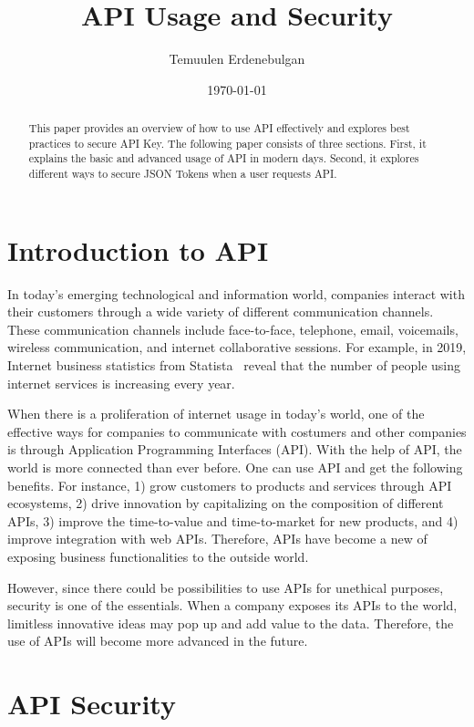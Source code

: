 \documentclass[11pt]{article}
\title{API Usage and Security}
\author{Temuulen Erdenebulgan}
\affil{
Department of Computer Science\\
Luther College\\
Decorah, IA 52101\\
erdete01@luther.edu
}
\date{\today}
\begin{document}
\maketitle

\begin{abstract}

    This paper provides an overview of how to use API effectively and explores best practices to secure API Key. The following paper consists of three sections. First, it explains the basic and advanced usage of API in modern days. Second, it explores different ways to secure JSON Tokens when a user requests API. 
\end{abstract}

\section{Introduction to API}

In today's emerging technological and information world, companies interact with their customers through a wide variety of different communication channels. These communication channels include face-to-face, telephone, email, voicemails, wireless communication, and internet collaborative sessions. For example, in 2019, Internet business statistics from Statista~\cite{Digital18:online} reveal that the number of people using internet services is increasing every year. 

When there is a proliferation of internet usage in today's world, one of the effective ways for companies to communicate with costumers and other companies is through Application Programming Interfaces (API). With the help of API, the world is more connected than ever before. One can use API and get the following benefits. For instance, 1) grow customers to products and services through API ecosystems, 2) drive innovation by capitalizing on the composition of different APIs, 3) improve the time-to-value and time-to-market for new products, and 4) improve integration with web APIs. Therefore, APIs have become a new of exposing business functionalities to the outside world. 

However, since there could be possibilities to use APIs for unethical purposes, security is one of the essentials. When a company exposes its APIs to the world, limitless innovative ideas may pop up and add value to the data. Therefore, the use of APIs will become more advanced in the future. 

\section{API Security}
\end{document}
